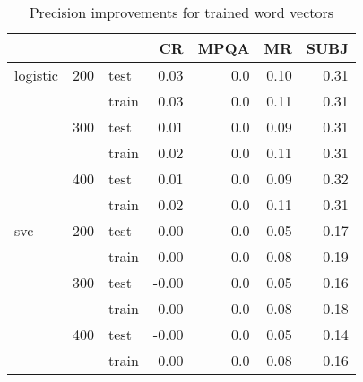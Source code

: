 \begin{table}[H]
\begin{center}

\begin{tabular}{lllrrrr}
\toprule
 & &&CR &MPQA &MR &SUBJ \\
\midrule
logistic & 200 & test & 0.03 &0.0 & 0.10 & 0.31 \\
 & & train & 0.03 &0.0 & 0.11 & 0.31 \\
 & 300 & test & 0.01 &0.0 & 0.09 & 0.31 \\
 & & train & 0.02 &0.0 & 0.11 & 0.31 \\
 & 400 & test & 0.01 &0.0 & 0.09 & 0.32 \\
 & & train & 0.02 &0.0 & 0.11 & 0.31 \\
svc & 200 & test &-0.00 &0.0 & 0.05 & 0.17 \\
 & & train & 0.00 &0.0 & 0.08 & 0.19 \\
 & 300 & test &-0.00 &0.0 & 0.05 & 0.16 \\
 & & train & 0.00 &0.0 & 0.08 & 0.18 \\
 & 400 & test &-0.00 &0.0 & 0.05 & 0.14 \\
 & & train & 0.00 &0.0 & 0.08 & 0.16 \\
\bottomrule
\end{tabular}


\caption[Precision improvements for trained word vectors]{Precision improvements for trained word vectors}
\label{tab:res:trainedwordvec}
\end{center}
\end{table}

